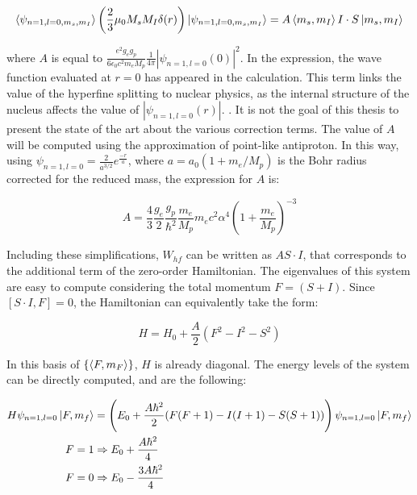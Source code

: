 \begin{equation}
\braket{\psi_{n=1,l=0,m_s,m_I}} \left ( \dfrac{2}{3} \mu_{0} M_{s} M_{I} \delta(r) \right ) \ket{\psi_{n=1,l=0,m_s,m_I}} =  A \braket{m_s,m_I} I \cdot S \ket{m_s, m_I} 
\end{equation}

where $A$ is equal to $ \frac{e^2 g_{e} g_{p}}{6 \epsilon_0 c^2 m_{e} M_{p}}  \frac{1}{4 \pi} |\psi_{n = 1, l = 0} (0)|^2$. In the expression, the wave function evaluated at $r = 0$ has appeared in the calculation. This term links the value of the hyperfine splitting to nuclear physics, as the internal structure of the nucleus affects the value of $|\psi_{n = 1, l = 0} (r)|$. . It is not the goal of this thesis to present the state of the art about the various correction terms. The value of $A$ will be computed using the approximation of point-like antiproton. In this way, using $\psi_{n=1,l=0} = \frac{2}{a^{3/2}} e^{\frac{-r}{a}}$, where $a = a_0 (1 + m_e/M_p)$ is the Bohr radius corrected for the reduced mass, the expression for $A$ is:

\begin{equation}
A = \frac{4}{3} \frac{g_e}{2} \frac{g_p}{\hbar^2} \frac{m_e}{M_p} m_e c^2 \alpha^4 \left(1 + \frac{m_e}{M_p}\right)^{-3}
\end{equation}

Including these simplifications, $W_{hf}$ can be written as $A S \cdot I$, that corresponds to the additional term of the zero-order Hamiltonian. The eigenvalues of this system are easy to compute considering the total momentum $F = (S + I)$. Since $[S\cdot I, F] = 0$, the Hamiltonian can equivalently take the form:

\begin{equation}
H = H_{0} + \frac{A}{2} (F^2 - I^2 - S^2)
\end{equation}

In this basis of $\{\braket{F, m_F}\}$, $H$ is already diagonal. The energy levels of the system can be directly computed, and are the following:

\begin{align}
H \psi_{n=1,l=0} \ket{F ,m_f} &=  \left( E_{0} + \frac{A \hbar^2}{2} (F(F+1) - I(I + 1) - S(S + 1)) \right) \psi_{n=1,l=0} \ket{F ,m_f} \\
F = 1 &\Rightarrow E_{0} + \frac{A\hbar^2}{4} \\
F = 0 &\Rightarrow E_{0} - \frac{3 A\hbar^2}{4}
\end{align}

